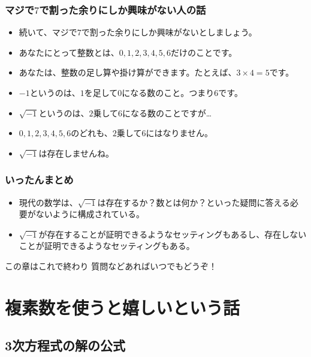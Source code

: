 \documentclass[dvipdfmx]{beamer}
\begin{document}
  \begin{frame}
    \frametitle{マジで$7$で割った余りにしか興味がない人の話}
  
    \begin{itemize}
      \item 続いて、マジで$7$で割った余りにしか興味がないとしましょう。
      \item あなたにとって整数とは、$0, 1, 2, 3, 4, 5, 6$だけのことです。
      \item あなたは、整数の足し算や掛け算ができます。たとえば、$3 \times 4 = 5$です。
      \pause
      \item $-1$というのは、$1$を足して$0$になる数のこと。つまり$6$です。
      \item $\sqrt{-1}$というのは、$2$乗して$6$になる数のことですが…
      \item $0, 1, 2, 3, 4, 5, 6$のどれも、$2$乗して$6$にはなりません。
      \item $\sqrt{-1}$は存在しませんね。
    \end{itemize}
  
  \end{frame}

  \begin{frame}
    \frametitle{いったんまとめ}
  
    \begin{itemize}
      \item 現代の数学は、$\sqrt{-1}$は存在するか？数とは何か？といった疑問に答える必要がないように構成されている。
      \item $\sqrt{-1}$が存在することが証明できるようなセッティングもあるし、存在しないことが証明できるようなセッティングもある。
    \end{itemize}

    \begin{block}{この章はこれで終わり}
      質問などあればいつでもどうぞ！
    \end{block}
  
  \end{frame}

  \section{複素数を使うと嬉しいという話}

  \subsection{3次方程式の解の公式}
\end{document}
